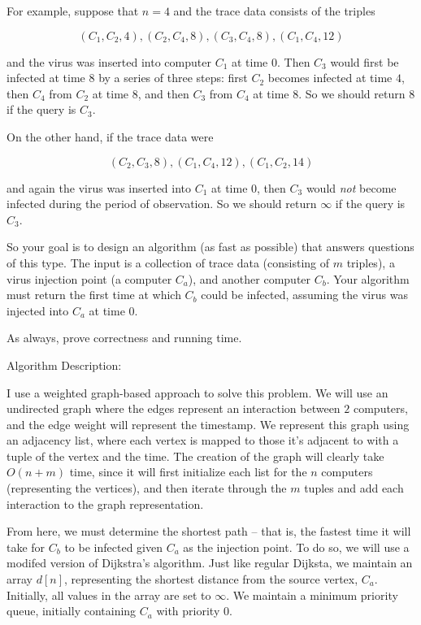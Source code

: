 \documentclass[11pt]{article}
\begin{document}
For example, suppose that $n = 4$ and the trace data consists of the triples

\begin{equation*}
    (C_1, C_2, 4), (C_2, C_4, 8), (C_3, C_4, 8), (C_1, C_4, 12)
\end{equation*}

and the virus was inserted into computer $C_1$ at time $0$.  Then $C_3$ would first be infected at time $8$ by a series of three steps: 
first $C_2$ becomes infected at time $4$, then $C_4$ from $C_2$ at time $8$, and then $C_3$ from $C_4$ at time $8$. 
So we should return $8$ if the query is $C_3$.

On the other hand, if the trace data were 

\begin{equation*}
    (C_2, C_3, 8), (C_1, C_4, 12), (C_1, C_2, 14)
\end{equation*}

and again the virus was inserted into $C_1$ at time $0$, then $C_3$ would \emph{not} become infected during the period of observation. 
So we should return $\infty$ if the query is $C_3$.

So your goal is to design an algorithm (as fast as possible) that answers questions of this type. The input is a collection of trace data 
(consisting of $m$ triples),  a virus injection point (a computer $C_a$), and another computer $C_b$. 
Your algorithm must return the first time at which $C_b$ could be infected, assuming the virus was injected into $C_a$ at time $0$.

As always, prove correctness and running time.

\bigbreak

Algorithm Description:

I use a weighted graph-based approach to solve this problem. We will use an undirected graph where the edges represent an interaction between $2$ 
computers, and the edge weight will represent the timestamp. We represent this graph using an adjacency list, where each vertex is 
mapped to those it's adjacent to with a tuple of the vertex and the time. The creation of the graph will clearly take $O(n + m)$ time, 
since it will first initialize each list for the $n$ computers (representing the vertices), and then iterate through the $m$ tuples 
and add each interaction to the graph representation.

From here, we must determine the shortest path -- that is, the fastest time it will take for $C_b$ to be infected given $C_a$ as the injection point. 
To do so, we will use a modifed version of Dijkstra's algorithm. Just like regular Dijksta, we maintain an array $d[n]$, representing the shortest 
distance from the source vertex, $C_a$. Initially, all values in the array are set to $\infty$. 
We maintain a minimum priority queue, initially containing $C_a$ with priority $0$. 
\end{document}
